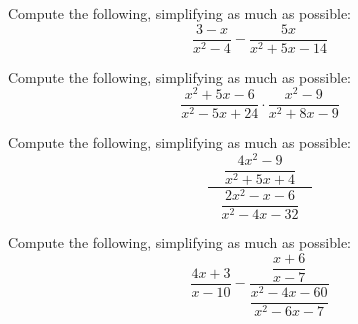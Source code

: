 \documentclass[11pt,letterpaper]{article}
\begin{document}
\newpage



 Compute the following, simplifying as much as possible:
	\[
	\dfrac{3 - x}{x^2 - 4} - \dfrac{5x}{x^2 + 5x -14}
	\]



\newpage



 Compute the following, simplifying as much as possible:
	\[
	\dfrac{x^2 + 5x - 6}{x^2 -5x + 24} \cdot \dfrac{x^2 - 9}{x^2 + 8x - 9}
	\]



\newpage



 Compute the following, simplifying as much as possible:
	\[
	\dfrac{\phantom{.}\;\;\;\dfrac{4x^2 - 9}{x^2 + 5x + 4}\;\;\;\phantom{.}}{\dfrac{2x^2 - x - 6}{x^2 - 4x - 32}}
	\]



\newpage



 Compute the following, simplifying as much as possible:
	\[
	\dfrac{4x + 3}{x - 10} - \dfrac{\phantom{.}\;\;\;\dfrac{x + 6}{x - 7}\;\;\;\phantom{.}}{\dfrac{x^2 - 4x - 60}{x^2 - 6x - 7}}
	\]
\end{document}
